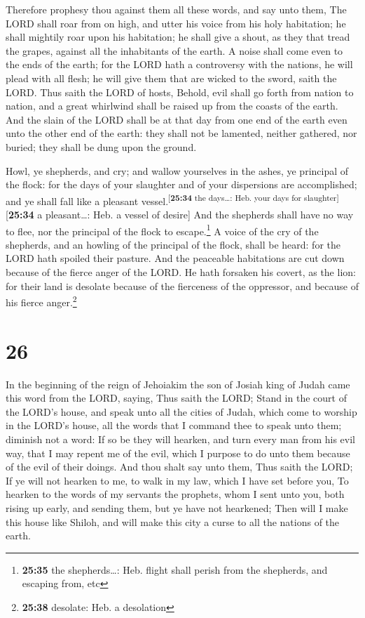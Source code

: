  Therefore prophesy thou against them all these words,
and say unto them, The LORD shall roar from on high, and utter his voice
from his holy habitation; he shall mightily roar upon his habitation; he
shall give a shout, as they that tread the grapes, against all the
inhabitants of the earth.  A noise shall come even to the
ends of the earth; for the LORD hath a controversy with the nations, he
will plead with all flesh; he will give them that are wicked to the
sword, saith the LORD.  Thus saith the LORD of hosts,
Behold, evil shall go forth from nation to nation, and a great whirlwind
shall be raised up from the coasts of the earth.  And the
slain of the LORD shall be at that day from one end of the earth even
unto the other end of the earth: they shall not be lamented, neither
gathered, nor buried; they shall be dung upon the ground.

 Howl, ye shepherds, and cry; and wallow yourselves in
the ashes, ye principal of the flock: for the days of your slaughter and
of your dispersions are accomplished; and ye shall fall like a pleasant
vessel.\textsuperscript{{[}\textbf{25:34} the days\ldots: Heb. your days
for slaughter{]}}{[}\textbf{25:34} a pleasant\ldots: Heb. a vessel of
desire{]}  And the shepherds shall have no way to flee,
nor the principal of the flock to escape.\footnote{\textbf{25:35} the
  shepherds\ldots: Heb. flight shall perish from the shepherds, and
  escaping from, etc}  A voice of the cry of the
shepherds, and an howling of the principal of the flock, shall be heard:
for the LORD hath spoiled their pasture.  And the
peaceable habitations are cut down because of the fierce anger of the
LORD.  He hath forsaken his covert, as the lion: for
their land is desolate because of the fierceness of the oppressor, and
because of his fierce anger.\footnote{\textbf{25:38} desolate: Heb. a
  desolation}

\hypertarget{section-25}{%
\section{26}\label{section-25}}

 In the beginning of the reign of Jehoiakim the son of
Josiah king of Judah came this word from the LORD, saying,
 Thus saith the LORD; Stand in the court of the LORD's
house, and speak unto all the cities of Judah, which come to worship in
the LORD's house, all the words that I command thee to speak unto them;
diminish not a word:  If so be they will hearken, and turn
every man from his evil way, that I may repent me of the evil, which I
purpose to do unto them because of the evil of their doings.
 And thou shalt say unto them, Thus saith the LORD; If ye
will not hearken to me, to walk in my law, which I have set before you,
 To hearken to the words of my servants the prophets, whom
I sent unto you, both rising up early, and sending them, but ye have not
hearkened;  Then will I make this house like Shiloh, and
will make this city a curse to all the nations of the earth.

